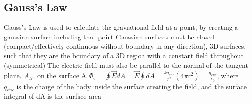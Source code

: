 \documentclass[11 pt, twoside]{article}
\newenvironment{outline*}
{
	\begin{outline}[enumerate]
	}
	{\end{outline}
}
\begin{document}
\subsection{Gauss's Law}
\begin{outline*}
\1 Gauss’s Law is used to calculate the graviational field at a point, by creating a gaussian surface including that point
\2 Gaussian surfaces must be closed (compact/effectively-continuous without boundary in any direction), 3D surfaces, such that they are the boundary of a 3D region with a constant field throughout (symmetrical)
\2 The electric field must also be parallel to the normal of the tangent plane, $A_N$, on the surface A
\2 $\Phi_e = \oint \vec{E} dA = \vec{E} \oint dA = \frac{kq_{enc}}{r^2} (4\pi r^2) = \frac{q_{enc}}{\epsilon_0}$, where $q_{enc}$ is the charge of the body inside the surface creating the field, and the surface integral of dA is the surface area
\end{outline*}
\end{document}
